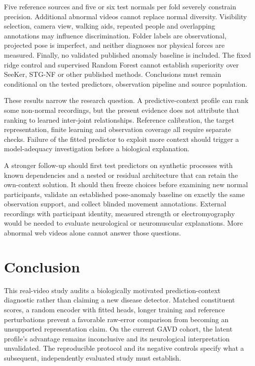 \documentclass[letterpaper]{article}
\begin{document}
Five reference sources and five or six test normals per fold severely constrain precision. Additional abnormal videos cannot replace normal diversity. Visibility selection, camera view, walking aids, repeated people and overlapping annotations may influence discrimination. Folder labels are observational, projected pose is imperfect, and neither diagnoses nor physical forces are measured. Finally, no validated published anomaly baseline is included. The fixed ridge control and supervised Random Forest cannot establish superiority over SeeKer, STG-NF or other published methods. Conclusions must remain conditional on the tested predictors, observation pipeline and source population.

These results narrow the research question. A predictive-context profile can rank some non-normal recordings, but the present evidence does not attribute that ranking to learned inter-joint relationships. Reference calibration, the target representation, finite learning and observation coverage all require separate checks. Failure of the fitted predictor to exploit more context should trigger a model-adequacy investigation before a biological explanation.

A stronger follow-up should first test predictors on synthetic processes with known dependencies and a nested or residual architecture that can retain the own-context solution. It should then freeze choices before examining new normal participants, validate an established pose-anomaly baseline on exactly the same observation support, and collect blinded movement annotations. External recordings with participant identity, measured strength or electromyography would be needed to evaluate neurological or neuromuscular explanations. More abnormal web videos alone cannot answer those questions.

\section{Conclusion}

This real-video study audits a biologically motivated prediction-context diagnostic rather than claiming a new disease detector. Matched constituent scores, a random encoder with fitted heads, longer training and reference perturbations prevent a favorable raw-error comparison from becoming an unsupported representation claim. On the current GAVD cohort, the latent profile's advantage remains inconclusive and its neurological interpretation unvalidated. The reproducible protocol and its negative controls specify what a subsequent, independently evaluated study must establish.

\end{document}
